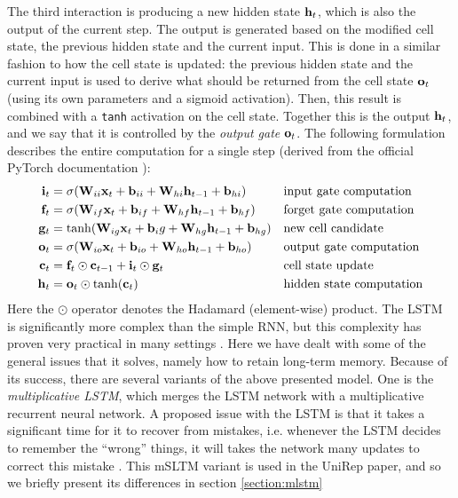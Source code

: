 \documentclass[a4paper,12pt]{article}
\begin{document}
The third interaction is producing a new hidden state $\mathbf{ h }_t$, which is also the output of the current step. The output is generated based on the modified cell state, the previous hidden state and the current input. This is done in a similar fashion to how the cell state is updated: the previous hidden state and the current input is used to derive what should be returned from the cell state $\mathbf{ o }_t$ (using its own parameters and a sigmoid activation). Then, this result is combined with a \texttt{tanh} activation on the cell state. Together this is the output $\mathbf{ h }_t$, and we say that it is controlled by the \textit{output gate} $\mathbf{ o }_t$. The following formulation describes the entire computation for a single step (derived from the official PyTorch documentation \cite{pytorch_lstm_doc}):
\begin{align*}
    \mathbf{ i }_t &= \sigma{\mathopen{} \left( \mathbf{ W }_{ii}\mathbf{ x }_t + \mathbf{ b }_{ii} + \mathbf{ W }_{hi}\mathbf{ h }_{t-1} + \mathbf{ b }_{hi} \right) \mathclose{}}&&\text{input gate computation}\\
    \mathbf{ f }_t &= \sigma {\mathopen{} \left( \mathbf{ W }_{if} \mathbf{ x }_t + \mathbf{ b }_{if} + \mathbf{ W }_{hf}\mathbf{ h }_{t-1} + \mathbf{ b }_{hf} \right) \mathclose{}} &&\text{forget gate computation}\\
    \mathbf{ g }_t &= \operatorname{tanh}\!{\mathopen{} \left( \mathbf{ W }_{ig} \mathbf{ x }_t + \mathbf{ b }_ig + \mathbf{ W }_{hg} \mathbf{ h }_{t - 1} + \mathbf{ b }_{hg} \right) \mathclose{}}&&\text{new cell candidate}\\
    \mathbf{ o }_t &= \sigma{\mathopen{} \left( \mathbf{ W }_{io} \mathbf{ x }_t + \mathbf{ b }_{io} + \mathbf{ W }_{ho}\mathbf{ h }_{t-1} + \mathbf{ b }_{ho} \right) \mathclose{}}&&\text{output gate computation}\\
    \mathbf{ c }_t &= \mathbf{ f }_t \odot \mathbf{ c }_{t-1} + \mathbf{ i }_t \odot \mathbf{ g }_t&&\text{cell state update}\\
    \mathbf{ h }_t &= \mathbf{ o }_t \odot \operatorname{tanh}\!{\mathopen{} \left( \mathbf{ c }_t \right) \mathclose{}}&&\text{hidden state computation}
\end{align*}
Here the $\odot$ operator denotes the Hadamard (element-wise) product. The LSTM is significantly more complex than the simple RNN, but this complexity has proven very practical in many settings \cite{chung2014empirical}. Here we have dealt with some of the general issues that it solves, namely how to retain long-term memory. Because of its success, there are several variants of the above presented model. One is the \textit{multiplicative LSTM}, which merges the LSTM network with a multiplicative recurrent neural network. A proposed issue with the LSTM is that it takes a significant time for it to recover from mistakes, i.e. whenever the LSTM decides to remember the ``wrong'' things, it will takes the network many updates to correct this mistake \cite{krause2016multiplicative}. 
This mSLTM variant is used in the UniRep paper, and so we briefly present its differences in section \ref{section:mlstm}
\end{document}
